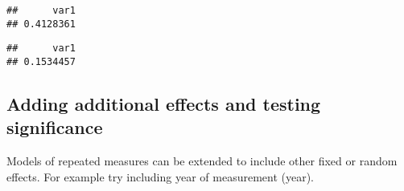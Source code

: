\documentclass[
  12pt,
]{book}
\newenvironment{Shaded}{\begin{snugshade}}{\end{snugshade}}
\newcommand{\FloatTok}[1]{\textcolor[rgb]{0.00,0.00,0.81}{#1}}
\newcommand{\FunctionTok}[1]{\textcolor[rgb]{0.00,0.00,0.00}{#1}}
\newcommand{\NormalTok}[1]{#1}
\newcommand{\OtherTok}[1]{\textcolor[rgb]{0.56,0.35,0.01}{#1}}
\newcommand{\SpecialCharTok}[1]{\textcolor[rgb]{0.00,0.00,0.00}{#1}}
\newcommand{\StringTok}[1]{\textcolor[rgb]{0.31,0.60,0.02}{#1}}
\begin{document}
\begin{Shaded}
\end{Shaded}

\begin{verbatim}
##      var1 
## 0.4128361
\end{verbatim}

\begin{Shaded}
\end{Shaded}

\begin{verbatim}
##      var1 
## 0.1534457
\end{verbatim}

\hypertarget{adding-additional-effects-and-testing-significance-1}{%
\subsection{Adding additional effects and testing significance}\label{adding-additional-effects-and-testing-significance-1}}

Models of repeated measures can be extended to include other fixed or random effects.
For example try including year of measurement (year).
\end{document}
